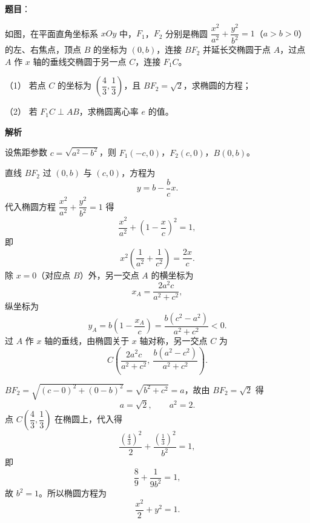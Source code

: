 \begin{answer}

\textbf{题目}：

如图，在平面直角坐标系 $xOy$ 中，$F_1$，$F_2$ 分别是椭圆 $\dfrac{x^2}{a^2}+\dfrac{y^2}{b^2}=1$（$a>b>0$）的左、右焦点，顶点 $B$ 的坐标为 $(0,b)$，连接 $BF_2$ 并延长交椭圆于点 $A$，过点 $A$ 作 $x$ 轴的垂线交椭圆于另一点 $C$，连接 $F_1C$。

（1） 若点 $C$ 的坐标为 $\left(\dfrac43,\dfrac13\right)$，且 $BF_2=\sqrt2$，求椭圆的方程；

（2） 若 $F_1C\perp AB$，求椭圆离心率 $e$ 的值。
\nopagebreak[4]
\begin{center}\end{center}
\nopagebreak[4]
\textbf{解析}

设焦距参数 $c=\sqrt{a^2-b^2}$，则 $F_1(-c,0)$，$F_2(c,0)$，$B(0,b)$。

直线 $BF_2$ 过 $(0,b)$ 与 $(c,0)$，方程为
\nopagebreak[4]
\[y=b-\frac bc x.\]
代入椭圆方程 $\dfrac{x^2}{a^2}+\dfrac{y^2}{b^2}=1$ 得
\nopagebreak[4]
\[\frac{x^2}{a^2}+\left(1-\frac xc\right)^2=1,\]
即
\nopagebreak[4]
\[x^2\left(\frac1{a^2}+\frac1{c^2}\right)=\frac{2x}c.\]
除 $x=0$（对应点 $B$）外，另一交点 $A$ 的横坐标为
\nopagebreak[4]
\[x_A=\frac{2a^2c}{a^2+c^2},\]
纵坐标为
\nopagebreak[4]
\[y_A=b\left(1-\frac{x_A}c\right)=\frac{b\left(c^2-a^2\right)}{a^2+c^2}<0.\]
过 $A$ 作 $x$ 轴的垂线，由椭圆关于 $x$ 轴对称，另一交点 $C$ 为
\nopagebreak[4]
\[C\left(\frac{2a^2c}{a^2+c^2},\ \frac{b\left(a^2-c^2\right)}{a^2+c^2}\right).\]


$BF_2=\sqrt{(c-0)^2+(0-b)^2}=\sqrt{b^2+c^2}=a$，故由 $BF_2=\sqrt2$ 得
\nopagebreak[4]
\[a=\sqrt2,\qquad a^2=2.\]
点 $C\left(\dfrac43,\dfrac13\right)$ 在椭圆上，代入得
\nopagebreak[4]
\[\frac{\left(\frac43\right)^2}{2}+\frac{\left(\frac13\right)^2}{b^2}=1,\]
即
\nopagebreak[4]
\[\frac89+\frac1{9b^2}=1,\]
故 $b^2=1$。所以椭圆方程为
\nopagebreak[4]
\[\frac{x^2}2+y^2=1.\]



\end{answer}
